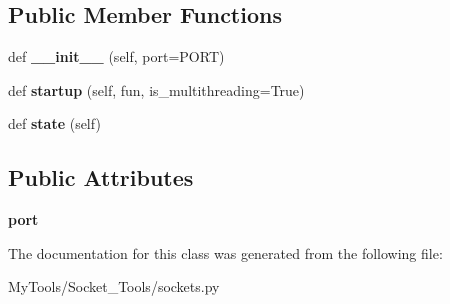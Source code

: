 \subsection*{Public Member Functions}
\begin{DoxyCompactItemize}
\item 
\mbox{\label{classMIS_1_1MyTools_1_1Socket__Tools_1_1sockets_1_1SocketServer_ac780c377df5451ad0a6f328eba5b8e0e}} 
def {\bfseries \+\_\+\+\_\+init\+\_\+\+\_\+} (self, port=P\+O\+RT)
\item 
\mbox{\label{classMIS_1_1MyTools_1_1Socket__Tools_1_1sockets_1_1SocketServer_a906e8e7d12b72cca829e9b3e839103eb}} 
def {\bfseries startup} (self, fun, is\+\_\+multithreading=True)
\item 
\mbox{\label{classMIS_1_1MyTools_1_1Socket__Tools_1_1sockets_1_1SocketServer_a928b10f6e1fc2ada66b8f1325f8cdbfc}} 
def {\bfseries state} (self)
\end{DoxyCompactItemize}
\subsection*{Public Attributes}
\begin{DoxyCompactItemize}
\item 
\mbox{\label{classMIS_1_1MyTools_1_1Socket__Tools_1_1sockets_1_1SocketServer_a7c015f1aff1936e0abec50257b7a5bf6}} 
{\bfseries port}
\end{DoxyCompactItemize}


The documentation for this class was generated from the following file\+:\begin{DoxyCompactItemize}
\item 
My\+Tools/\+Socket\+\_\+\+Tools/sockets.\+py\end{DoxyCompactItemize}
